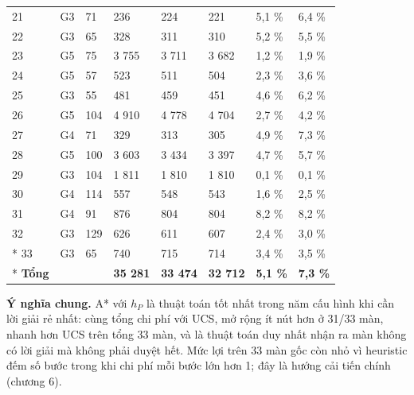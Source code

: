 \begin{longtable}[]{@{}llllllll@{}}
21 & G3 & 71 & 236 & 224 & 221 & 5,1 \% & 6,4 \% \\
22 & G3 & 65 & 328 & 311 & 310 & 5,2 \% & 5,5 \% \\
23 & G5 & 75 & 3 755 & 3 711 & 3 682 & 1,2 \% & 1,9 \% \\
24 & G5 & 57 & 523 & 511 & 504 & 2,3 \% & 3,6 \% \\
25 & G3 & 55 & 481 & 459 & 451 & 4,6 \% & 6,2 \% \\
26 & G5 & 104 & 4 910 & 4 778 & 4 704 & 2,7 \% & 4,2 \% \\
27 & G4 & 71 & 329 & 313 & 305 & 4,9 \% & 7,3 \% \\
28 & G5 & 100 & 3 603 & 3 434 & 3 397 & 4,7 \% & 5,7 \% \\
29 & G3 & 104 & 1 811 & 1 810 & 1 810 & 0,1 \% & 0,1 \% \\
30 & G4 & 114 & 557 & 548 & 543 & 1,6 \% & 2,5 \% \\
31 & G4 & 91 & 876 & 804 & 804 & 8,2 \% & 8,2 \% \\
32 & G3 & 129 & 626 & 611 & 607 & 2,4 \% & 3,0 \% \\*
33 & G3 & 65 & 740 & 715 & 714 & 3,4 \% & 3,5 \% \\*
\textbf{Tổng} & & & \textbf{35 281} & \textbf{33 474} & \textbf{32 712} & \textbf{5,1 \%} & \textbf{7,3 \%} \\
\end{longtable}

\textbf{Ý nghĩa chung.} A* với \(h_P\) là thuật toán tốt nhất trong năm cấu hình khi cần lời giải rẻ nhất: cùng tổng chi phí với UCS, mở rộng ít nút hơn ở 31/33 màn, nhanh hơn UCS trên tổng 33 màn, và là thuật toán duy nhất nhận ra màn không có lời giải mà không phải duyệt hết. Mức lợi trên 33 màn gốc còn nhỏ vì heuristic đếm số bước trong khi chi phí mỗi bước lớn hơn 1; đây là hướng cải tiến chính (chương 6).
